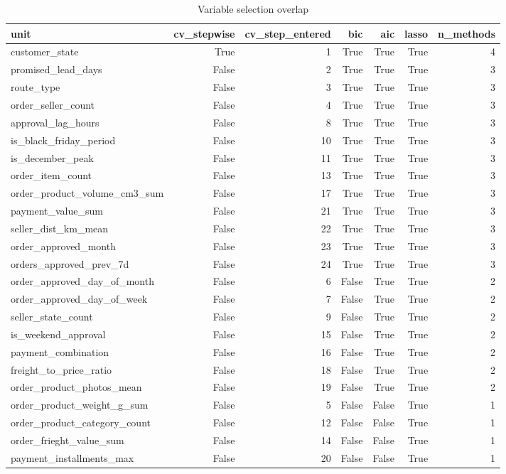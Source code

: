 \begin{table}[htbp]
\centering
\small
\caption{Variable selection overlap}
\begin{tabular}{lrrrrrr}
\toprule
unit & cv\_stepwise & cv\_step\_entered & bic & aic & lasso & n\_methods \\
\midrule
customer\_state & True & 1 & True & True & True & 4 \\
promised\_lead\_days & False & 2 & True & True & True & 3 \\
route\_type & False & 3 & True & True & True & 3 \\
order\_seller\_count & False & 4 & True & True & True & 3 \\
approval\_lag\_hours & False & 8 & True & True & True & 3 \\
is\_black\_friday\_period & False & 10 & True & True & True & 3 \\
is\_december\_peak & False & 11 & True & True & True & 3 \\
order\_item\_count & False & 13 & True & True & True & 3 \\
order\_product\_volume\_cm3\_sum & False & 17 & True & True & True & 3 \\
payment\_value\_sum & False & 21 & True & True & True & 3 \\
seller\_dist\_km\_mean & False & 22 & True & True & True & 3 \\
order\_approved\_month & False & 23 & True & True & True & 3 \\
orders\_approved\_prev\_7d & False & 24 & True & True & True & 3 \\
order\_approved\_day\_of\_month & False & 6 & False & True & True & 2 \\
order\_approved\_day\_of\_week & False & 7 & False & True & True & 2 \\
seller\_state\_count & False & 9 & False & True & True & 2 \\
is\_weekend\_approval & False & 15 & False & True & True & 2 \\
payment\_combination & False & 16 & False & True & True & 2 \\
freight\_to\_price\_ratio & False & 18 & False & True & True & 2 \\
order\_product\_photos\_mean & False & 19 & False & True & True & 2 \\
order\_product\_weight\_g\_sum & False & 5 & False & False & True & 1 \\
order\_product\_category\_count & False & 12 & False & False & True & 1 \\
order\_frieght\_value\_sum & False & 14 & False & False & True & 1 \\
payment\_installments\_max & False & 20 & False & False & True & 1 \\
\bottomrule
\end{tabular}
\par\smallskip\begin{minipage}{\linewidth}\footnotesize \end{minipage}
\end{table}


